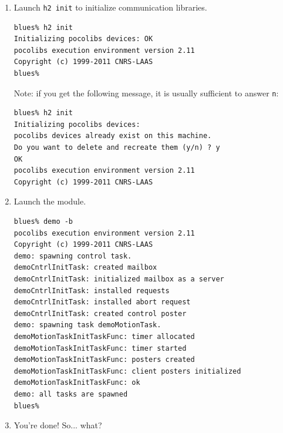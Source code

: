 \begin{enumerate}
\item Launch \texttt{h2 init} to initialize communication libraries.

\begin{center}\begin{cartouche}\small\begin{verbatim}
blues% h2 init
Initializing pocolibs devices: OK
pocolibs execution environment version 2.11
Copyright (c) 1999-2011 CNRS-LAAS
blues%
\end{verbatim}\end{cartouche}\end{center}

Note: if you get the following message, it is usually sufficient to
answer \texttt{n}:

\begin{center}\begin{cartouche}\small\begin{verbatim}
blues% h2 init
Initializing pocolibs devices: 
pocolibs devices already exist on this machine.
Do you want to delete and recreate them (y/n) ? y
OK
pocolibs execution environment version 2.11
Copyright (c) 1999-2011 CNRS-LAAS
\end{verbatim}\end{cartouche}\end{center}

\item Launch the module.

\begin{center}\begin{cartouche}\small\begin{verbatim}
blues% demo -b
pocolibs execution environment version 2.11
Copyright (c) 1999-2011 CNRS-LAAS
demo: spawning control task.
demoCntrlInitTask: created mailbox
demoCntrlInitTask: initialized mailbox as a server
demoCntrlInitTask: installed requests
demoCntrlInitTask: installed abort request
demoCntrlInitTask: created control poster
demo: spawning task demoMotionTask.
demoMotionTaskInitTaskFunc: timer allocated
demoMotionTaskInitTaskFunc: timer started
demoMotionTaskInitTaskFunc: posters created
demoMotionTaskInitTaskFunc: client posters initialized
demoMotionTaskInitTaskFunc: ok
demo: all tasks are spawned
blues% 
\end{verbatim}\end{cartouche}\end{center}

\item You're done! So... what?
\end{enumerate}

